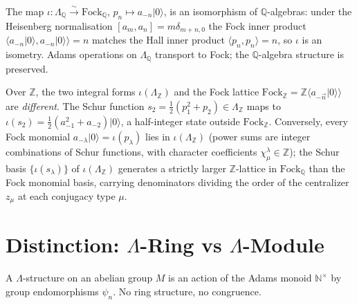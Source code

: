 \begin{observation}
\label{v4-arith:obs:fock-macdonald-Q}
The map \(\iota\colon\Lambda_{\mathbb{Q}}\xrightarrow{\sim}\mathrm{Fock}_{\mathbb{Q}}\),
\(p_{n}\mapsto a_{-n}|0\rangle\), is an isomorphism of
\(\mathbb{Q}\)-algebras: under the Heisenberg normalisation
\([a_m,a_n]=m\delta_{m+n,0}\) the Fock inner product
\(\langle a_{-n}|0\rangle,a_{-n}|0\rangle\rangle=n\) matches the Hall
inner product \(\langle p_n,p_n\rangle=n\), so \(\iota\) is an
isometry. Adams operations on \(\Lambda_{\mathbb{Q}}\) transport to
Fock; the \(\mathbb{Q}\)-algebra structure is preserved.
\end{observation}

\begin{observation}
\label{v4-arith:obs:lattice-mismatch-Z}
Over \(\mathbb{Z}\), the two integral forms \(\iota(\Lambda_{\mathbb{Z}})\)
and the Fock lattice
\(\mathrm{Fock}_{\mathbb{Z}}=\mathbb{Z}\langle a_{-\vec{n}}|0\rangle\rangle\)
are \emph{different}. The Schur function
\(s_{2}=\tfrac{1}{2}(p_{1}^{2}+p_{2})\in\Lambda_{\mathbb{Z}}\) maps to
\(\iota(s_2)=\tfrac{1}{2}(a_{-1}^{2}+a_{-2})|0\rangle\), a half-integer
state outside \(\mathrm{Fock}_{\mathbb{Z}}\). Conversely, every Fock
monomial \(a_{-\lambda}|0\rangle=\iota(p_\lambda)\) lies in
\(\iota(\Lambda_{\mathbb{Z}})\) (power sums are integer combinations of
Schur functions, with character coefficients
\(\chi^\lambda_\mu\in\mathbb{Z}\)); the Schur basis
\(\{\iota(s_\lambda)\}\) of \(\iota(\Lambda_{\mathbb{Z}})\) generates a
strictly larger \(\mathbb{Z}\)-lattice in \(\mathrm{Fock}_{\mathbb{Q}}\)
than the Fock monomial basis, carrying denominators dividing the order
of the centralizer \(z_\mu\) at each conjugacy type \(\mu\).
\end{observation}

\section{Distinction: \(\Lambda\)-Ring vs \(\Lambda\)-Module}
\label{v4-arith:gb:ring-vs-module}

\begin{definition}
\label{v4-arith:def:lambda-module}
A \(\Lambda\)-structure on an abelian group \(M\) is an action of the
Adams monoid \(\mathbb{N}^{\times}\) by group endomorphisms
\(\psi_{n}\). No ring structure, no congruence.
\end{definition}

